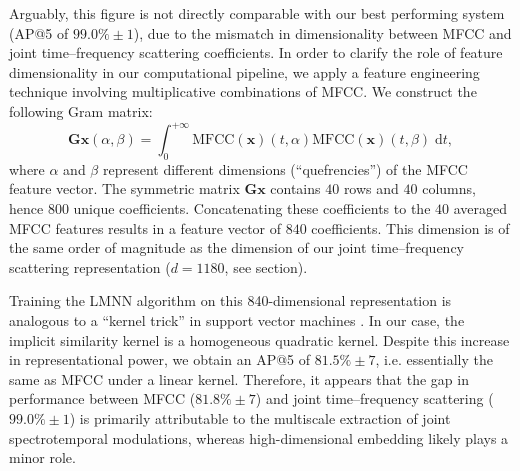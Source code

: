 \documentclass{bmcart}
\newcommand{\lnameref}[1]{%
\bgroup
\let\nmu\MakeLowercase
\nameref{#1}\egroup}
\newcommand{\nmu}{}
\begin{document}
Arguably, this figure is not directly comparable with our best performing system (AP@5 of $99.0\%\pm 1$), due to the mismatch in dimensionality between MFCC and joint time--frequency scattering coefficients.
In order to clarify the role of feature dimensionality in our computational pipeline, we apply a feature engineering technique involving multiplicative combinations of MFCC.
We construct the following Gram matrix:
\begin{equation}
\mathbf{G} \boldsymbol{x}(\alpha, \beta) =
\int_0^{+\infty}
\mathrm{MFCC}(\boldsymbol{x})(t, \alpha)
\mathrm{MFCC}(\boldsymbol{x})(t, \beta)
\;\mathrm{d}t,
\end{equation}
where $\alpha$ and $\beta$ represent different dimensions (``quefrencies'') of the MFCC feature vector.
The symmetric matrix $\mathbf{G}\boldsymbol{x}$ contains $40$ rows and $40$ columns, hence $800$ unique coefficients.
Concatenating these coefficients to the $40$ averaged MFCC features results in a feature vector of $840$ coefficients.
This dimension is of the same order of magnitude as the dimension of our joint time--frequency scattering representation ($d=1180$, see \lnameref{sec:methods} section).

Training the LMNN algorithm on this 840-dimensional representation is analogous to a ``kernel trick'' in support vector machines \cite{chang2010jmlr}.
In our case, the implicit similarity kernel is a homogeneous quadratic kernel.
Despite this increase in representational power, we obtain an AP@5 of $81.5\% \pm 7$, i.e. essentially the same as MFCC under a linear kernel.
Therefore, it appears that the gap in performance between MFCC ($81.8\%\pm 7$) and joint time--frequency scattering ($99.0\% \pm 1$) is primarily attributable to the multiscale extraction of joint spectrotemporal modulations, whereas high-dimensional embedding likely plays a minor role.

\end{document}
